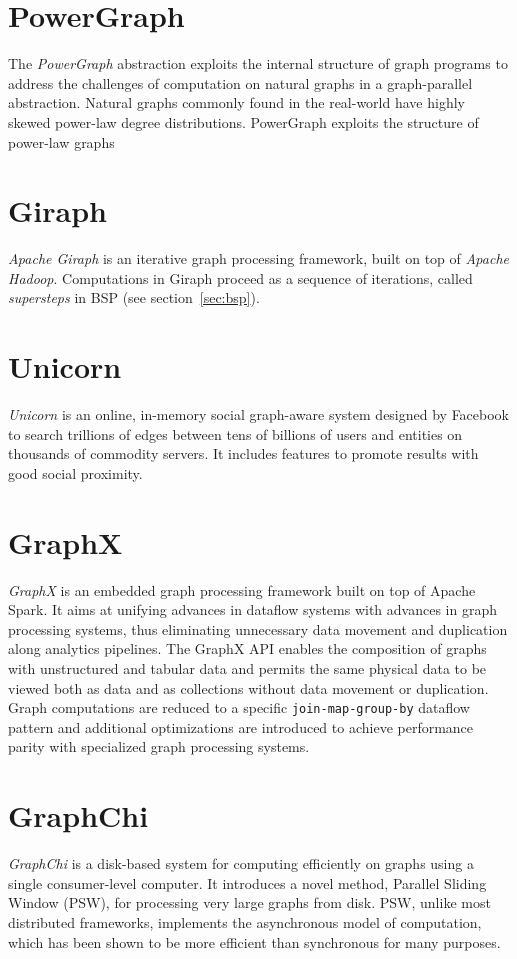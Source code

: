 \documentclass[letterpaper,twocolumn,10pt]{article}
\begin{document}
\section{PowerGraph}
The \textit{PowerGraph} abstraction exploits the internal structure of graph programs to address the challenges of computation on natural graphs in a graph-parallel abstraction. 
Natural graphs commonly found in the real-world have highly skewed power-law degree distributions.
PowerGraph exploits the structure of power-law graphs 

\section{Giraph}
\textit{Apache Giraph} is an iterative graph processing framework, built on top of \textit{Apache  Hadoop}.
Computations in Giraph proceed as a sequence of iterations, called \textit{supersteps} in BSP (see section~\ref{sec:bsp}).

\section{Unicorn}
\textit{Unicorn} is an online, in-memory social graph-aware system designed by Facebook to search trillions of edges between tens of billions of users and entities on thousands of commodity servers. It includes features to promote results with good social proximity.

\section{GraphX}
\textit{GraphX} is an embedded graph processing framework built on top of Apache Spark. It aims at unifying advances in dataflow systems with advances in graph processing systems, thus eliminating unnecessary data movement and duplication along analytics pipelines. The GraphX API enables the composition of graphs with unstructured and tabular data and permits the same physical data to be viewed both as data and as collections without data movement or duplication.
Graph computations are reduced to a specific {\tt join-map-group-by} dataflow pattern and additional optimizations are introduced to achieve performance parity with specialized graph processing systems.

\section{GraphChi}
\textit{GraphChi} is a disk-based system for computing efficiently on graphs using a single consumer-level computer. It introduces a novel method, Parallel Sliding Window (PSW), for processing very large graphs from disk. PSW, unlike most distributed frameworks, implements the asynchronous model of computation, which has been shown to be more efficient than synchronous for many purposes.	
\end{document}
